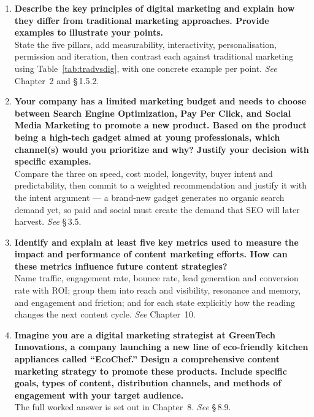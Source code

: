 \documentclass{MMTextbook}
\begin{document}
\begin{enumerate}[leftmargin=2.2em,itemsep=1.4ex]
\item \textbf{Describe the key principles of digital marketing and explain how
      they differ from traditional marketing approaches. Provide examples to
      illustrate your points.}
      \\
      State the five pillars, add measurability, interactivity,
      personalisation, permission and iteration, then contrast each against
      traditional marketing using Table~\ref{tab:tradvsdig}, with one concrete
      example per point. \hfill\emph{See} Chapter~2 and \S\,1.5.2.

\item \textbf{Your company has a limited marketing budget and needs to choose
      between Search Engine Optimization, Pay Per Click, and Social Media
      Marketing to promote a new product. Based on the product being a high-tech
      gadget aimed at young professionals, which channel(s) would you prioritize
      and why? Justify your decision with specific examples.}
      \\
      Compare the three on speed, cost model, longevity, buyer intent and
      predictability, then commit to a weighted recommendation and justify it
      with the intent argument --- a brand-new gadget generates no organic search
      demand yet, so paid and social must create the demand that SEO will later
      harvest. \hfill\emph{See} \S\,3.5.

\item \textbf{Identify and explain at least five key metrics used to measure the
      impact and performance of content marketing efforts. How can these metrics
      influence future content strategies?}
      \\
      Name traffic, engagement rate, bounce rate, lead generation and conversion
      rate with ROI; group them into reach and visibility, resonance and memory,
      and engagement and friction; and for each state explicitly how the reading
      changes the next content cycle. \hfill\emph{See} Chapter~10.

\item \textbf{Imagine you are a digital marketing strategist at GreenTech
      Innovations, a company launching a new line of eco-friendly kitchen
      appliances called ``EcoChef.'' Design a comprehensive content marketing
      strategy to promote these products. Include specific goals, types of
      content, distribution channels, and methods of engagement with your target
      audience.}
      \\
      The full worked answer is set out in Chapter~8.
      \hfill\emph{See} \S\,8.9.


\end{enumerate}
\end{document}
